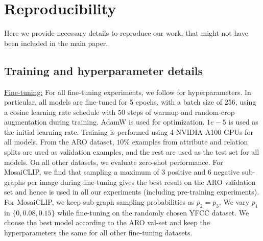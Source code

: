 \documentclass[11pt]{article}
\newcommand{\methodcomp}{MosaiCLIP}
\begin{document}
\section{Reproducibility}
\label{reproducibility}
Here we provide necessary details to reproduce our work, that might not have been included in the main paper.
\subsection{Training and hyperparameter details}
\label{hyperparams}
\underline{Fine-tuning:} For all fine-tuning experiments, we follow \citet{yuksekgonul2022and} for hyperparameters. In particular, all models are fine-tuned for 5 epochs, with a batch size of 256, using a cosine learning rate schedule with 50 steps of warmup and random-crop augmentation during training. AdamW is used for optimization. $1e-5$ is used as the initial learning rate. Training is performed using 4 NVIDIA A100 GPUs for all models. From the ARO dataset, $10\%$ examples from attribute and relation splits are used as validation examples, and the rest are used as the test set for all models. On all other datasets, we evaluate zero-shot performance. For \methodcomp{}, we find that sampling a maximum of 3 positive and 6 negative sub-graphs per image during fine-tuning gives the best result on the ARO validation set and hence is used in all our experiments (including pre-training experiments). 
For \methodcomp{}, we keep sub-graph sampling probabilities as $p_2=p_3$. We vary $p_1$ in $\{0, 0.08, 0.15\}$ while fine-tuning on the randomly chosen YFCC dataset. We choose the best model according to the ARO val-set and keep the hyperparameters the same for all other fine-tuning datasets.
\end{document}
